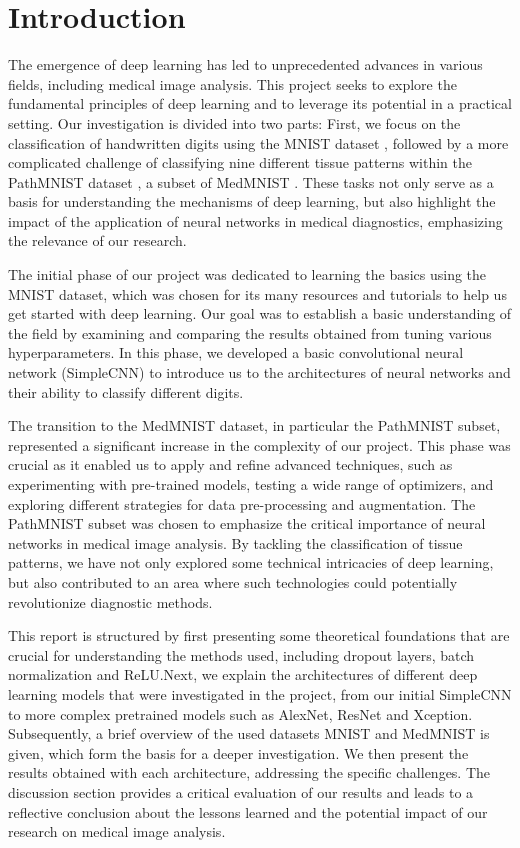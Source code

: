 \section{Introduction}\label{intro}


The emergence of deep learning has led to unprecedented advances in various fields, including medical image analysis. This project seeks to explore the fundamental principles of deep learning and to leverage its potential in a practical setting. Our investigation is divided into two parts: First, we focus on the classification of handwritten digits using the MNIST dataset \citep{mnist}, followed by a more complicated challenge of classifying nine different tissue patterns within the PathMNIST dataset \citep{kather2018, kather2019}, a subset of MedMNIST \citep{medmnistv1}. These tasks not only serve as a basis for understanding the mechanisms of deep learning, but also highlight the impact of the application of neural networks in medical diagnostics, emphasizing the relevance of our research.

The initial phase of our project was dedicated to learning the basics using the MNIST dataset, which was chosen for its many resources and tutorials to help us get started with deep learning. Our goal was to establish a basic understanding of the field by examining and comparing the results obtained from tuning various hyperparameters. In this phase, we developed a basic convolutional neural network (SimpleCNN) to introduce us to the architectures of neural networks and their ability to classify different digits.

The transition to the MedMNIST dataset, in particular the PathMNIST subset, represented a significant increase in the complexity of our project. This phase was crucial as it enabled us to apply and refine advanced techniques, such as experimenting with pre-trained models, testing a wide range of optimizers, and exploring different strategies for data pre-processing and augmentation. The PathMNIST subset was chosen to emphasize the critical importance of neural networks in medical image analysis. By tackling the classification of tissue patterns, we have not only explored some technical intricacies of deep learning, but also contributed to an area where such technologies could potentially revolutionize diagnostic methods.

This report is structured by first presenting some theoretical foundations that are crucial for understanding the methods used, including dropout layers, batch normalization and ReLU.\@ Next, we explain the architectures of different deep learning models that were investigated in the project, from our initial SimpleCNN to more complex pretrained models such as AlexNet, ResNet and Xception. Subsequently, a brief overview of the used datasets MNIST and MedMNIST is given, which form the basis for a deeper investigation. We then present the results obtained with each architecture, addressing the specific challenges. The discussion section provides a critical evaluation of our results and leads to a reflective conclusion about the lessons learned and the potential impact of our research on medical image analysis.
